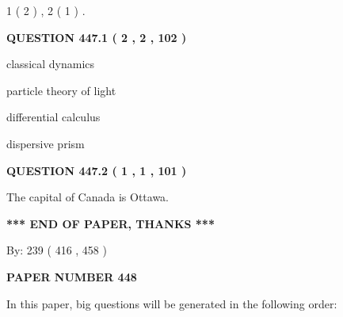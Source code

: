 \documentclass[12pt]{article}
\begin{document}
   
   1 ( 2 )
 ,
   2 ( 1 )
 .
  
\vspace{0.2in}
  
{\textbf{\Large{QUESTION
447.1 
 ( 2 , 2 , 102 )
}}}
  
  
 
 
\noindent{}
 
 
classical dynamics
 
 
particle theory of light
 
 
differential calculus
 
 
dispersive prism
 
 
 
 
  
\vspace{0.2in}
  
{\textbf{\Large{QUESTION
447.2 
 ( 1 , 1 , 101 )
}}}
  
  
 
 
\noindent{}
 
 
The capital of Canada is Ottawa.
 
 
 
 
   
   
\vspace{1.0in} 
{\textbf{\large{ *** END OF PAPER, THANKS *** }}} 
   
   
\hspace{1.0in} By: 
 239 ( 416 ,  458 )
   
   
   
   
\newpage 
\setcounter{page}{ 
   448001 } 
   
   
   
   
 {\textbf{ \Large{ PAPER NUMBER  448  }}}
   
   
\vspace{0.2in}
   
   
   
   
   
\vspace{0.2in}
   
In this paper, big questions will be generated in the following order: 
   
\end{document}
